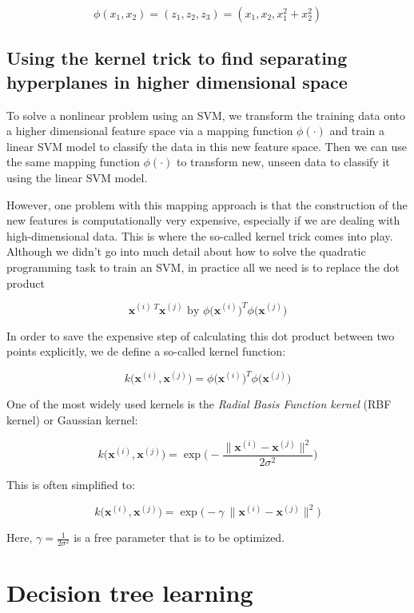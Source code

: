 \documentclass[letterpaper]{report}
\begin{document}
\[
\phi(x_1, x_2) = (z_1, z_2, z_3) = (x_1, x_2, x_{1}^{2} + x_{2}^{2})
\]

\subsection{Using the kernel trick to find separating hyperplanes in higher dimensional space}

To solve a nonlinear problem using an SVM, we transform the training data onto a higher dimensional feature space via a mapping function $\phi(\cdot)$ and train a linear SVM model to classify the data in this new feature space. Then we can use the same mapping function $\phi(\cdot)$ to transform new, unseen data to classify it using the linear SVM model.

However, one problem with this mapping approach is that the construction of the new features is computationally very expensive, especially if we are dealing with high-dimensional data. This is where the so-called kernel trick comes into play. Although we didn't go into much detail about how to solve the quadratic programming task to train an SVM, in practice all we need is to replace the dot product 

\[
\mathbf{x}^{(i) \; T} \mathbf{x}^{(j)} \text{ by } \phi \big( \mathbf{x}^{(i)} \big)^T \phi \big( \mathbf{x}^{(j)} \big)
\]


In order to save the expensive step of calculating this dot product between two points explicitly, we de define a so-called kernel function:

\[
k \big( \mathbf{x}^{(i)}, \mathbf{x}^{(j)}  \big) = \phi \big( \mathbf{x}^{(i)} \big)^T \phi \big( \mathbf{x}^{(j)} \big)
\]

One of the most widely used kernels is the \textit{Radial Basis Function kernel} (RBF kernel) or Gaussian kernel:

\[
k \big( \mathbf{x}^{(i)}, \mathbf{x}^{(j)}  \big) = \exp \Bigg( - \frac{ \lVert \mathbf{x}^{(i)} - \mathbf{x}^{(j)} \rVert^2  }{2 \sigma^2} \Bigg)
\]

This is often simplified to:

\[
k \big( \mathbf{x}^{(i)}, \mathbf{x}^{(j)}  \big) = \exp \bigg(  -\gamma\ \lVert \mathbf{x}^{(i)} - \mathbf{x}^{(j)} \rVert^2  \bigg)
\]

Here, $\gamma = \frac{1}{2 \sigma^2}$ is a free parameter that is to be optimized.

\section{Decision tree learning}
\end{document}
